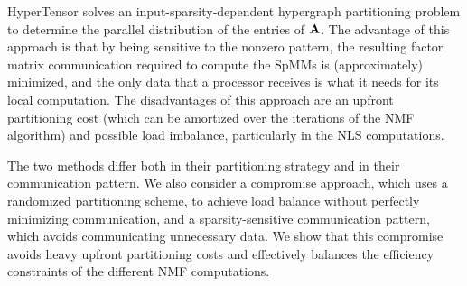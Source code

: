 HyperTensor solves an input-sparsity-dependent hypergraph partitioning problem to determine the parallel distribution of the entries of $\AA$.
The advantage of this approach is that by being sensitive to the nonzero pattern, the resulting factor matrix communication required to compute the SpMMs is (approximately) minimized, and the only data that a processor receives is what it needs for its local computation.
The disadvantages of this approach are an upfront partitioning cost (which can be amortized over the iterations of the NMF algorithm) and possible load imbalance, particularly in the NLS computations.

The two methods differ both in their partitioning strategy and in their communication pattern.
We also consider a compromise approach, which uses a randomized partitioning scheme, to achieve load balance without perfectly minimizing communication, and a sparsity-sensitive communication pattern, which avoids communicating unnecessary data.
We show that this compromise avoids heavy upfront partitioning costs and effectively balances the efficiency constraints of the different NMF computations.


